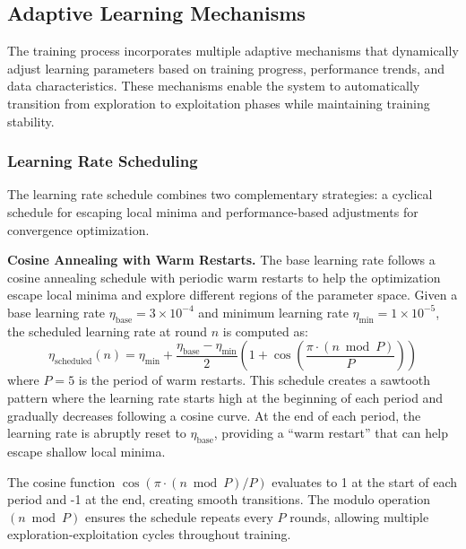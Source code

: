 \subsection{Adaptive Learning Mechanisms}

The training process incorporates multiple adaptive mechanisms that dynamically adjust learning parameters based on training progress, performance trends, and data characteristics. These mechanisms enable the system to automatically transition from exploration to exploitation phases while maintaining training stability.

\subsubsection{Learning Rate Scheduling}

The learning rate schedule combines two complementary strategies: a cyclical schedule for escaping local minima and performance-based adjustments for convergence optimization.

\textbf{Cosine Annealing with Warm Restarts.} The base learning rate follows a cosine annealing schedule with periodic warm restarts to help the optimization escape local minima and explore different regions of the parameter space. Given a base learning rate $\eta_{\text{base}} = 3 \times 10^{-4}$ and minimum learning rate $\eta_{\text{min}} = 1 \times 10^{-5}$, the scheduled learning rate at round $n$ is computed as:
%
\begin{equation}
\eta_{\text{scheduled}}(n) = \eta_{\text{min}} + \frac{\eta_{\text{base}} - \eta_{\text{min}}}{2}\left(1 + \cos\left(\frac{\pi \cdot (n \bmod P)}{P}\right)\right)
\end{equation}
%
where $P = 5$ is the period of warm restarts. This schedule creates a sawtooth pattern where the learning rate starts high at the beginning of each period and gradually decreases following a cosine curve. At the end of each period, the learning rate is abruptly reset to $\eta_{\text{base}}$, providing a ``warm restart'' that can help escape shallow local minima.

The cosine function $\cos(\pi \cdot (n \bmod P) / P)$ evaluates to 1 at the start of each period and -1 at the end, creating smooth transitions. The modulo operation $(n \bmod P)$ ensures the schedule repeats every $P$ rounds, allowing multiple exploration-exploitation cycles throughout training.


